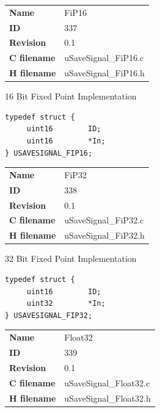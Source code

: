 \ifdefined \AddTestReports
{}
\fi
{}
\nopagebreak[0]
\begin{tabular}{l l}
\textbf{Name} & FiP16 \tabularnewline
\textbf{ID} & 337 \tabularnewline
\textbf{Revision} & 0.1 \tabularnewline
\textbf{C filename} & uSaveSignal\_FiP16.c \tabularnewline
\textbf{H filename} & uSaveSignal\_FiP16.h \tabularnewline
\end{tabular}
\vspace{1ex}

16 Bit Fixed Point Implementation

\begin{lstlisting}
typedef struct {
     uint16        ID;
     uint16        *In;
} USAVESIGNAL_FIP16;
\end{lstlisting}

\ifdefined \AddTestReports
{}
\fi
{}
\nopagebreak[0]
\begin{tabular}{l l}
\textbf{Name} & FiP32 \tabularnewline
\textbf{ID} & 338 \tabularnewline
\textbf{Revision} & 0.1 \tabularnewline
\textbf{C filename} & uSaveSignal\_FiP32.c \tabularnewline
\textbf{H filename} & uSaveSignal\_FiP32.h \tabularnewline
\end{tabular}
\vspace{1ex}

32 Bit Fixed Point Implementation

\begin{lstlisting}
typedef struct {
     uint16        ID;
     uint32        *In;
} USAVESIGNAL_FIP32;
\end{lstlisting}

\ifdefined \AddTestReports
{}
\fi
{}
\nopagebreak[0]
\begin{tabular}{l l}
\textbf{Name} & Float32 \tabularnewline
\textbf{ID} & 339 \tabularnewline
\textbf{Revision} & 0.1 \tabularnewline
\textbf{C filename} & uSaveSignal\_Float32.c \tabularnewline
\textbf{H filename} & uSaveSignal\_Float32.h \tabularnewline
\end{tabular}
\vspace{1ex}

